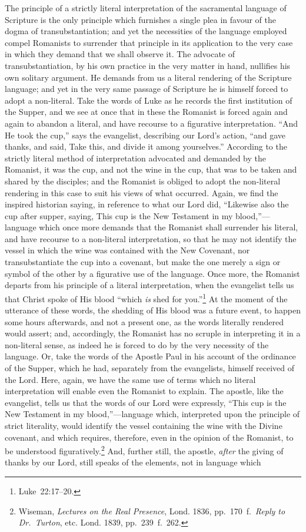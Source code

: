 \documentclass[
  english,
]{book}
\begin{document}
The principle of a strictly literal interpretation of the sacramental language of Scripture is the only principle which furnishes a single plea in favour of the dogma of transubstantiation; and yet the necessities of the language employed compel Romanists to surrender that principle in its application to the very case in which they demand that we shall observe it. The advocate of transubstantiation, by his own practice in the very matter in hand, nullifies his own solitary argument. He demands from us a literal rendering of the Scripture language; and yet in the very same passage of Scripture he is himself forced to adopt a non-literal. Take the words of Luke as he records the first institution of the Supper, and we see at once that in these the Romanist is forced again and again to abandon a literal, and have recourse to a figurative interpretation. ``And He took the cup,'' says the evangelist, describing our Lord's action, ``and gave thanks, and said, Take this, and divide it among yourselves.'' According to the strictly literal method of interpretation advocated and demanded by the Romanist, it was the cup, and not the wine in the cup, that was to be taken and shared by the disciples; and the Romanist is obliged to adopt the non-literal rendering in this case to suit his views of what occurred. Again, we find the inspired historian saying, in reference to what our Lord did, ``Likewise also the cup after supper, saying, This cup is the New Testament in my blood,''---language which once more demands that the Romanist shall surrender his literal, and have recourse to a non-literal interpretation, so that he may not identify the vessel in which the wine was contained with the New Covenant, nor transubstantiate the cup into a covenant, but make the one merely a sign or symbol of the other by a figurative use of the language. Once more, the Romanist departs from his principle of a literal interpretation, when the evangelist tells us that Christ spoke of His blood ``which \emph{is} shed for you.''\footnote{Luke~22:17--20.} At the moment of the utterance of these words, the shedding of His blood was a future event, to happen some hours afterwards, and not a present one, as the words literally rendered would assert; and, accordingly, the Romanist has no scruple in interpreting it in a non-literal sense, as indeed he is forced to do by the very necessity of the language. Or, take the words of the Apostle Paul in his account of the ordinance of the Supper, which he had, separately from the evangelists, himself received of the Lord. Here, again, we have the same use of terms which no literal interpretation will enable even the Romanist to explain. The apostle, like the evangelist, tells us that the words of our Lord were expressly, ``This cup is the New Testament in my blood,''---language which, interpreted upon the principle of strict literality, would identify the vessel containing the wine with the Divine covenant, and which requires, therefore, even in the opinion of the Romanist, to be understood figuratively.\footnote{Wiseman, \emph{Lectures on the Real Presence}, Lond. 1836, pp.~170~f.~\emph{Reply to Dr.~Turton}, etc. Lond. 1839, pp.~239~f.~262.} And, further still, the apostle, \emph{after} the giving of thanks by our Lord, still speaks of the elements, not in language which 
\end{document}
